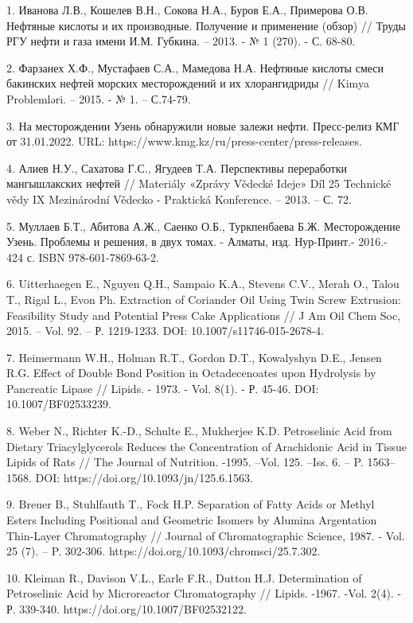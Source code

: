 \begin{noparindent}
1. Иванова Л.В., Кошелев В.Н., Сокова Н.А., Буров Е.А., Примерова О.В.
Нефтяные кислоты и их производные. Получение и применение (обзор) //
Труды РГУ нефти и газа имени И.М. Губкина. -- 2013. - № 1 (270). - С.
68-80.

2. Фарзанех Х.Ф., Мустафаев С.А., Мамедова Н.А. Нефтяные кислоты смеси
бакинских нефтей морских месторождений и их хлорангидриды // Kimya
Problemləri. -- 2015. - № 1. -- С.74-79.

3. На месторождении Узень обнаружили новые залежи нефти. Пресс-релиз КМГ
от 31.01.2022. URL: https://www.kmg.kz/ru/press-center/press-releases.

4. Алиев Н.У., Сахатова Г.С., Ягудеев Т.А. Перспективы переработки
мангышлакских нефтей // Materiály «Zprávy Vědecké Ideje» Díl 25
Technické vědy IX Mezinárodní Vědecko - Praktická Konference. -- 2013.
-- С. 72.

5. Муллаев Б.Т., Абитова А.Ж., Саенко О.Б., Туркпенбаева Б.Ж.
Месторождение Узень. Проблемы и решения, в двух томах. - Алматы, изд.
Нур-Принт.- 2016.- 424 с. ISBN 978-601-7869-63-2.

6. Uitterhaegen E., Nguyen Q.H., Sampaio K.A., Stevens C.V., Merah O.,
Talou T., Rigal L., Evon Ph. Extraction of Coriander Oil Using Twin
Screw Extrusion: Feasibility Study and Potential Press Cake Applications
// J Am Oil Chem Soc, 2015. -- Vol. 92. -- Р. 1219-1233. DOI:
10.1007/s11746-015-2678-4.

7. Heimermann W.H., Holman R.T., Gordon D.T., Kowalyshyn D.E., Jensen
R.G. Effect of Double Bond Position in Octadecenoates upon Hydrolysis by
Pancreatic Lipase // Lipids. - 1973. - Vol. 8(1). - Р. 45-46. DOI:
10.1007/BF02533239.

8. Weber N., Richter K.-D., Schulte E., Mukherjee K.D. Petroselinic Acid
from Dietary Triacylglycerols Reduces the Concentration of Arachidonic
Acid in Tissue Lipids of Rats // The Journal of Nutrition. -1995. --Vol.
125. --Iss. 6. -- P. 1563--1568. DOI:
https://doi.org/10.1093/jn/125.6.1563.

9. Breuer B., Stuhlfauth T., Fock H.P. Separation of Fatty Acids or
Methyl Esters Including Positional and Geometric Isomers by Alumina
Argentation Thin-Layer Chromatography // Journal of Chromatographic
Science, 1987. - Vol. 25 (7). -- P. 302-306.
https://doi.org/10.1093/chromsci/25.7.302.

10. Kleiman R., Davison V.L., Earle F.R., Dutton H.J. Determination of
Petroselinic Acid by Microreactor Chromatography // Lipids. -1967. -Vol.
2(4). - Р. 339-340. https://doi.org/10.1007/BF02532122.


\end{noparindent}
